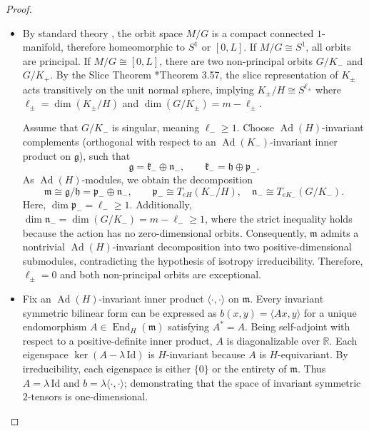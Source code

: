 \documentclass[12pt,a4paper]{amsart}
\theoremstyle{plain}
\theoremstyle{definition}
\theoremstyle{remark}
\begin{document}
\begin{proof}
\begin{itemize}
    \item[(i)] By standard theory \cites{Mostert,Bredon,alexandrino2015lie}, the orbit space $M/G$ is a compact connected $1$-manifold, therefore homeomorphic to $S^1$ or $[0,L]$. If $M/G \cong S^1$, all orbits are principal. If $M/G \cong [0,L]$, there are two non-principal orbits $G/K_-$ and $G/K_+$. By the Slice Theorem \cite{alexandrino2015lie}*{Theorem 3.57}, the slice representation of $K_\pm$ acts transitively on the unit normal sphere, implying $K_\pm/H \cong S^{\ell_\pm}$ where $\ell_\pm = \dim(K_\pm/H)$ and $\dim(G/K_\pm) = m - \ell_\pm$.

    Assume that $G/K_-$ is singular, meaning $\ell_- \ge 1$. Choose $\operatorname{Ad}(H)$-invariant complements (orthogonal with respect to an $\operatorname{Ad}(K_-)$-invariant inner product on $\mathfrak{g}$), such that
    \[
    \mathfrak{g} = \mathfrak{k}_- \oplus \mathfrak{n}_-,\qquad \mathfrak{k}_- = \mathfrak{h} \oplus \mathfrak{p}_-.
    \]
    As $\operatorname{Ad}(H)$-modules, we obtain the decomposition
    \[
    \mathfrak{m} \cong \mathfrak{g}/\mathfrak{h} = \mathfrak{p}_- \oplus \mathfrak{n}_-,\qquad \mathfrak{p}_- \cong T_{eH}(K_-/H),\quad \mathfrak{n}_- \cong T_{eK_-}(G/K_-).
    \]
    Here, $\dim\mathfrak{p}_- = \ell_- \ge 1$. Additionally, $\dim\mathfrak{n}_- = \dim(G/K_-) = m - \ell_- \ge 1$, where the strict inequality holds because the action has no zero-dimensional orbits. Consequently, $\mathfrak{m}$ admits a nontrivial $\operatorname{Ad}(H)$-invariant decomposition into two positive-dimensional submodules, contradicting the hypothesis of isotropy irreducibility. Therefore, $\ell_\pm = 0$ and both non-principal orbits are exceptional.

    \item[(ii)] Fix an $\operatorname{Ad}(H)$-invariant inner product $\langle\cdot,\cdot\rangle$ on $\mathfrak{m}$. Every invariant symmetric bilinear form can be expressed as $b(x,y) = \langle Ax,y\rangle$ for a unique endomorphism $A \in \operatorname{End}_H(\mathfrak{m})$ satisfying $A^\ast = A$. Being self-adjoint with respect to a positive-definite inner product, $A$ is diagonalizable over $\mathbb{R}$. Each eigenspace $\ker(A - \lambda\,\mathrm{Id})$ is $H$-invariant because $A$ is $H$-equivariant. By irreducibility, each eigenspace is either $\{0\}$ or the entirety of $\mathfrak{m}$. Thus $A = \lambda\,\mathrm{Id}$ and $b = \lambda\langle\cdot,\cdot\rangle$; demonstrating that the space of invariant symmetric $2$-tensors is one-dimensional.


\end{itemize}
\end{proof}
\end{document}

